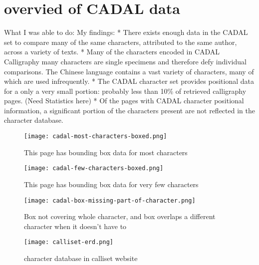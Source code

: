 \chapter{overvied of CADAL data}
What I was able to do:
    My findings:
        * There exists enough data in the CADAL set to compare many of the same characters, attributed to the same author, across a variety of texts.
        *  Many of the characters encoded in CADAL Calligraphy many characters are single specimens and therefore defy individual comparisons.  The Chinese language contains a vast variety of characters, many of which are used infrequently.
        *  The CADAL character set provides positional data for a only a very small portion: probably less than 10\% of retrieved calligraphy pages.  (Need Statistics here)
        *  Of the pages with CADAL character positional information, a significant portion of the characters present are not reflected in the character database.
    
    \begin{figure}{} %
    \parbox{12cm}{\texttt{[image: cadal-most-characters-boxed.png]}}
    \caption{This page has bounding box data for most characters}
    \label{cadal most characters boxed}
    \end{figure}
    
    \begin{figure}{} %
    \parbox{12cm}{\texttt{[image: cadal-few-characters-boxed.png]}}
    \caption{This page has bounding box data for very few characters}
    \label{cadal less characters boxed}
    \end{figure}
    
    \begin{figure}{}
    \parbox{12cm}{\texttt{[image: cadal-box-missing-part-of-character.png]}}
    \caption{Box not covering whole character, and box overlaps a different character when it doesn't have to}
    \label{cadal single character examples}
    \end{figure}
    
    \begin{figure}{}
    \parbox{12cm}{\texttt{[image: calliset-erd.png]}}
    \caption{character database in calliset website}
    \label{character database in calliset website}
    \end{figure}
    
